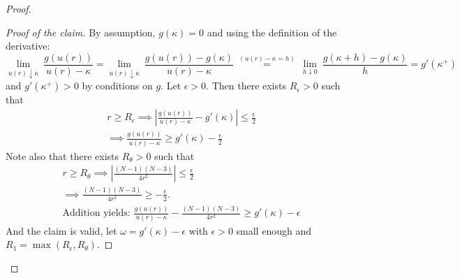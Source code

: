 \begin{proof}
\begin{proof}[Proof of the claim] By assumption, $g(\kappa)=0$ and using the definition of the derivative: $$\underset{u(r)\downarrow\kappa}{\lim}~\frac{g(u(r))}{u(r)-\kappa}=\underset{u(r)\downarrow\kappa}{\lim}~\frac{g(u(r))-g(\kappa)}{u(r)-\kappa}~\overset{(u(r)-\kappa=h)}{=}~\underset{h\downarrow0}{\lim}~\frac{g(\kappa+h)-g(\kappa)}{h}=g'(\kappa^+)$$ and $g'(\kappa^+)>0$ by conditions on $g$. Let $\epsilon>0$. Then there exists $R_\epsilon>0$ such that \begin{gather*}r\geq R_\epsilon\implies\left|\frac{g(u(r))}{u(r)-\kappa}-g'(\kappa)\right|\leq\frac{\epsilon}{2}\\ %
\implies\frac{g(u(r))}{u(r)-\kappa}\geq g'(\kappa)-\frac{\epsilon}{2}\tag{A} \end{gather*}Note also that there exists $R_\theta>0$ such that \begin{gather*}r\geq R_\theta\implies\left|\frac{(N-1)(N-3)}{4r^2}\right|\leq\frac{\epsilon}{2}\\%
\implies\frac{(N-1)(N-3)}{4r^2}\geq-\frac{\epsilon}{2}.\tag{B}\\ \text{Addition yields: }\frac{g(u(r))}{u(r)-\kappa}-\frac{(N-1)(N-3)}{4r^2}\geq g'(\kappa)-\epsilon\tag{A+B}\end{gather*} And the claim is valid, let $\omega=g'(\kappa)-\epsilon$ with $\epsilon>0$ small enough and $R_1=\max(R_\epsilon,R_\theta)$. \end{proof}


\end{proof}
